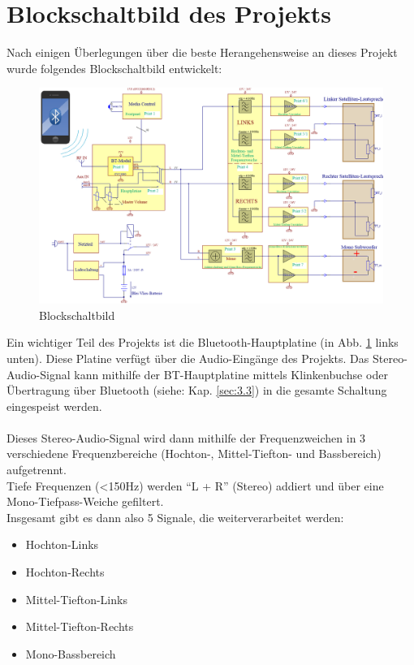 \section{Blockschaltbild des Projekts}\label{sec:3.1}
Nach einigen Überlegungen über die beste Herangehensweise an dieses Projekt wurde folgendes Blockschaltbild entwickelt:
\begin{figure} [H]
	\centering
	\includegraphics[width=1\textwidth]{img/blockschaltbildV2.png}
	\caption{Blockschaltbild}
	\label{fig:3.1.1}
\end{figure}
Ein wichtiger Teil des Projekts ist die Bluetooth-Hauptplatine (in Abb. \ref{fig:3.1.1} links unten).
Diese Platine verfügt über die Audio-Eingänge des Projekts.
Das Stereo-Audio-Signal kann mithilfe der BT-Hauptplatine mittels Klinkenbuchse oder Übertragung über Bluetooth (siehe: Kap. \ref{sec:3.3}) in die gesamte Schaltung eingespeist werden.
\\ \\
Dieses Stereo-Audio-Signal wird dann mithilfe der Frequenzweichen in 3 verschiedene Frequenzbereiche (Hochton-, Mittel-Tiefton- und Bassbereich) aufgetrennt.
\\
Tiefe Frequenzen (<150Hz) werden \enquote{L + R} (Stereo) addiert und über eine Mono-Tiefpass-Weiche gefiltert.
\\
Insgesamt gibt es dann also 5 Signale, die weiterverarbeitet werden:
\\ 
\begin{itemize}
	\item Hochton-Links
	\item Hochton-Rechts
	\item Mittel-Tiefton-Links
	\item Mittel-Tiefton-Rechts
	\item Mono-Bassbereich
\end{itemize}


